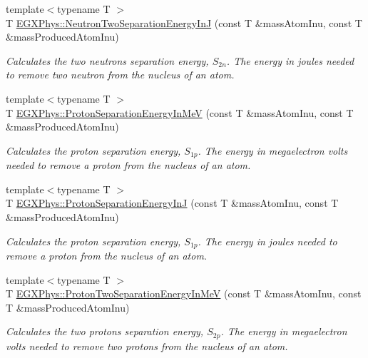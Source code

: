 \begin{DoxyCompactItemize}
{\footnotesize template$<$typename T $>$ }\\T \mbox{\hyperlink{group___e_g_x_phys-_nuclear_separation_energy_ga293ac9428420a0adf4235048dbe529b4}{E\+G\+X\+Phys\+::\+Neutron\+Two\+Separation\+Energy\+InJ}} (const T \&mass\+Atom\+Inu, const T \&mass\+Produced\+Atom\+Inu)
\begin{DoxyCompactList}\small\item\em Calculates the two neutrons separation energy, $S_{2n}$. The energy in joules needed to remove two neutron from the nucleus of an atom. \end{DoxyCompactList}\item 
{\footnotesize template$<$typename T $>$ }\\T \mbox{\hyperlink{group___e_g_x_phys-_nuclear_separation_energy_ga6a619ded55c47ed22ea2d8a85202ebeb}{E\+G\+X\+Phys\+::\+Proton\+Separation\+Energy\+In\+MeV}} (const T \&mass\+Atom\+Inu, const T \&mass\+Produced\+Atom\+Inu)
\begin{DoxyCompactList}\small\item\em Calculates the proton separation energy, $S_{1p}$. The energy in megaelectron volts needed to remove a proton from the nucleus of an atom. \end{DoxyCompactList}\item 
{\footnotesize template$<$typename T $>$ }\\T \mbox{\hyperlink{group___e_g_x_phys-_nuclear_separation_energy_ga4274d8f5a3860169fd81970707eb582a}{E\+G\+X\+Phys\+::\+Proton\+Separation\+Energy\+InJ}} (const T \&mass\+Atom\+Inu, const T \&mass\+Produced\+Atom\+Inu)
\begin{DoxyCompactList}\small\item\em Calculates the proton separation energy, $S_{1p}$. The energy in joules needed to remove a proton from the nucleus of an atom. \end{DoxyCompactList}\item 
{\footnotesize template$<$typename T $>$ }\\T \mbox{\hyperlink{group___e_g_x_phys-_nuclear_separation_energy_ga0de42783a7c650eb32f85dc2d40d84d7}{E\+G\+X\+Phys\+::\+Proton\+Two\+Separation\+Energy\+In\+MeV}} (const T \&mass\+Atom\+Inu, const T \&mass\+Produced\+Atom\+Inu)
\begin{DoxyCompactList}\small\item\em Calculates the two protons separation energy, $S_{2p}$. The energy in megaelectron volts needed to remove two protons from the nucleus of an atom. \end{DoxyCompactList}\item 

\end{DoxyCompactItemize}
